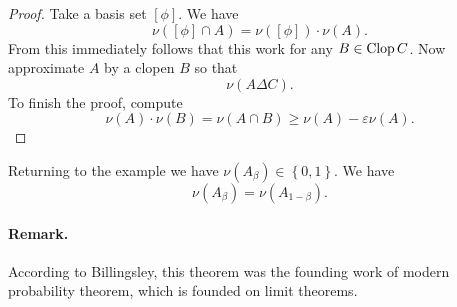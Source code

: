 \begin{proof}
Take a basis set \( \left[ \phi \right] \). We have
\[ 
    \nu \left( \left[ \phi \right] \cap A \right) = \nu \left( \left[ \phi \right] \right) \cdot \nu(A).
\]
From this immediately follows that this work for any \( B \in \operatorname{Clop} C \).
Now approximate \( A \) by a clopen \( B \) so that
\[ 
    \nu \left( A \Delta C \right).
\]
To finish the proof, compute
\[ 
    \nu(A) \cdot \nu(B) = \nu( A \cap B ) \geqslant \nu(A) -\varepsilon\nu(A). 
\]
\end{proof}

Returning to the example we have \( \nu(A_\beta) \in \left\{ 0,1 \right\} \). We have
\[ 
    \nu(A_\beta) = \nu (A_{1-\beta}).
\]


\paragraph{Remark.} According to Billingsley, this theorem was the founding work of modern probability theorem, which is founded on limit theorems.
